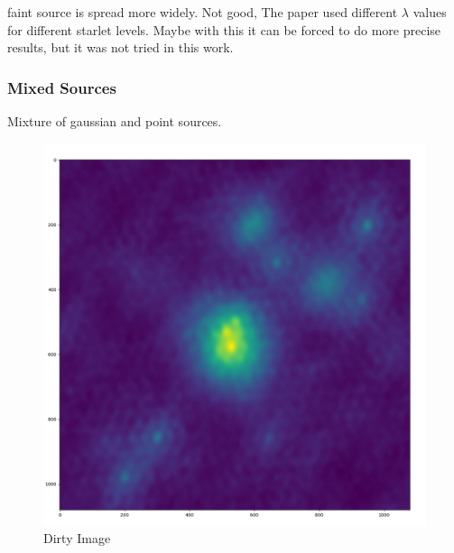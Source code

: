 faint source is spread more widely. Not good, The paper \cite{starck2015starlet} used different $\lambda$ values for different starlet levels. Maybe with this it can be forced to do more precise results, but it was not tried in this work.

\subsubsection{Mixed Sources}
Mixture of gaussian and point sources. 

\begin{figure}[h]
	\centering
	\includegraphics[width=0.5\linewidth]{./chapters/05.algorithms/results/sim00_mixed_sources_dirty.png}
	\caption{Dirty Image}
	\label{alg:gauss:dirty}
\end{figure}

